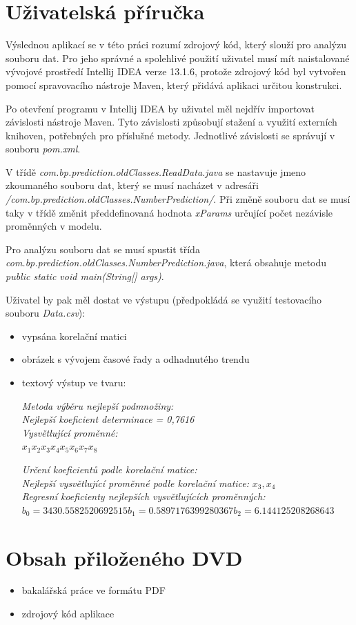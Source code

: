 \documentclass[a4paper,12pt,twoside]{scrreprt}
\begin{document}
\newpage %
\appendix %

\chapter{Uživatelská příručka} %

Výslednou aplikací se v této práci rozumí zdrojový kód, který slouží pro analýzu souboru dat. Pro jeho správné a spolehlivé použití uživatel musí mít naistalované vývojové prostředí Intellij IDEA verze 13.1.6, protože zdrojový kód byl vytvořen pomocí spravovacího nástroje Maven, který přidává aplikaci určitou konstrukci. 

Po otevření programu v Intellij IDEA by uživatel měl nejdřív importovat závislosti nástroje Maven. Tyto závislosti způsobují stažení a využití externích knihoven, potřebných pro příslušné metody. Jednotlivé závislosti se správují v souboru \textit{pom.xml}. 

V třídě \textit{com.bp.prediction.oldClasses.ReadData.java} se nastavuje jmeno zkoumaného souboru dat, který se musí nacházet v adresáři \textit{/com.bp.prediction.oldClasses.NumberPrediction/}. Při změně souboru dat se musí taky v třídě změnit předdefinovaná hodnota \textit{xParams} určující počet nezávisle proměnných v modelu.

Pro analýzu souboru dat se musí spustit třída \textit{com.bp.prediction.oldClasses.NumberPrediction.java}, která obsahuje metodu \textit{public static void main(String[] args)}.

Uživatel by pak měl dostat ve výstupu (předpokládá se využití testovacího souboru \textit{Data.csv}):

\begin{itemize}
\item vypsána korelační matici 
\item obrázek s vývojem časové řady a odhadnutého trendu
\item textový výstup ve tvaru:

\textit{Metoda výběru nejlepší podmnožiny:} \\
\textit{Nejlepší koeficient determinace = 0,7616} \\
\textit{Vysvětlující proměnné:} \\
$x_1 x_2 x_3 x_4 x_5 x_6 x_7 x_8$

\textit{Určení koeficientů podle korelační matice:} \\
\textit{Nejlepší vysvětlující proměnné podle korelační matice:} $x_3, x_4$ \\
\textit{Regresní koeficienty nejlepších vysvětlujících proměnných:} \\
$b_0 = 3430.5582520692515 b_1 = 0.5897176399280367 b_2 = 6.144125208268643$
\end{itemize}

\chapter{Obsah přiloženého DVD}

\begin{itemize}
\item bakalářská práce ve formátu PDF
\item zdrojový kód aplikace
\end{itemize}
\end{document}
